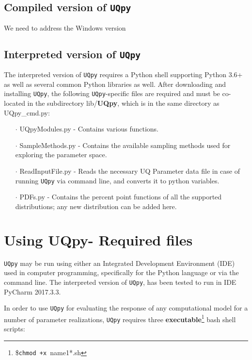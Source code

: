 \documentclass[preprint,12pt]{elsarticle}
\begin{document}
\subsection{Compiled version of \texttt{UQpy}}

\noindent
{\color{red} We need to address the Windows version}

\subsection{Interpreted version of \texttt{UQpy}}

\noindent
The interpreted version of \texttt{UQpy} requires a Python shell supporting Python 3.6+ as well as several common Python libraries as well.  After downloading and installing \texttt{UQpy}, the following \texttt{UQpy}-specific files are required and must be co-located in the subdirectory lib/\textbf{UQpy}, which is in the same directory as {\color{blue}UQpy\_cmd.py}:

\begin{itemize}
\item[$\cdot$] {\color{blue}UQpyModules.py} - Contains various functions.
\item[$\cdot$] {\color{blue}SampleMethods.py} - Contains the available sampling methods used for exploring the parameter space.
\item[$\cdot$] {\color{blue}ReadInputFile.py} -  Reads the necessary UQ Parameter data file  in case of running \texttt{UQpy}  via command line, and converts it to  python variables. 
\item[$\cdot$] {\color{blue}PDFs.py} - Contains the percent point functions of all the supported distributions; any new distribution can be added here. 
\end{itemize}

\section{Using UQpy- Required files}

\noindent
\texttt{UQpy} may be run using either an Integrated Development Environment (IDE) used in computer programming, specifically for the Python language or via the command line. The interpreted version of \texttt{UQpy}, has been tested to run in IDE PyCharm 2017.3.3.

In order to use  \texttt{UQpy} for evaluating the response of any computational model for a number of parameter realizations,  \texttt{UQpy}  requires three \textbf{executable}\footnote{\$\texttt{chmod +x }{\color{red}name1*.sh} } bash shell scripts: 
\end{document}
